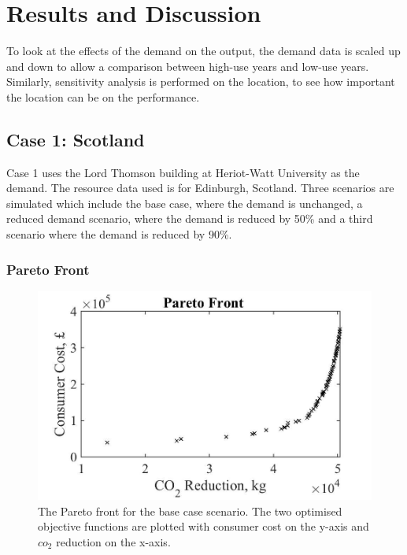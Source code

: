 \section{Results and Discussion}

To look at the effects of the demand on the output, the demand data is scaled up and down to allow a comparison between high-use years and low-use years. Similarly, sensitivity analysis is performed on the location, to see how important the location can be on the performance.

\subsection{Case 1: Scotland }

Case 1 uses the Lord Thomson building at Heriot-Watt University as the demand. The resource data used is for Edinburgh, Scotland. Three scenarios are simulated which include the base case, where the demand is unchanged, a reduced demand scenario, where the demand is reduced by 50\% and a third scenario where the demand is reduced by 90\%. 

\subsubsection{Pareto Front}

\begin{figure}[H]
	\centering
    \includegraphics[width=\columnwidth]{Figures/ParetoBase.jpg}
    \caption{The Pareto front for the base case scenario. The two optimised objective functions are plotted with consumer cost on the y-axis and $co_2$ reduction on the x-axis.}
    \label{fig:ParetoBase}
\end{figure}

